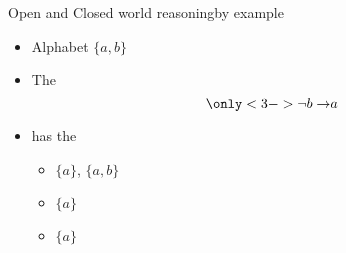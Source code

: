 \begin{frame}{Open and Closed world reasoning}{by example}
  \bigskip
  \begin{itemize}
  \item Alphabet $\{a,b\}$
    \medskip
  \item<2-> The 
    \[
      \only<3->{\neg b\to} a
    \]
  \item<2->[] has the
    \par\smallskip
    \begin{itemize}\normalsize
    \item {}         $\{a\}$, $\{a,b\}$
      \smallskip
    \item {} $\{a\}$
      \smallskip
    \item {}  $\{a\}$
    \end{itemize}
  \end{itemize}
\end{frame}
%
